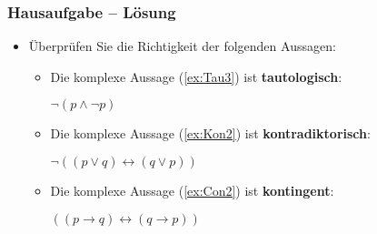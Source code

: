 
\begin{frame}
	\frametitle{Hausaufgabe -- Lösung}
	
	\begin{itemize}
		\item Überprüfen Sie die Richtigkeit der folgenden Aussagen:
		
		\vspace{1em}
		
		\begin{itemize}
			\item Die komplexe Aussage (\ref{ex:Tau3}) ist \textbf{tautologisch}:
			
			\ea\label{ex:Tau3} $\lnot (p \land \lnot p)$
			\z
			
			\item Die komplexe Aussage (\ref{ex:Kon2}) ist \textbf{kontradiktorisch}:
			
			\ea\label{ex:Kon2} $\lnot ((p \lor q) \leftrightarrow (q \lor p))$
			\z
			
			\item Die komplexe Aussage (\ref{ex:Con2}) ist \textbf{kontingent}:
			
			\ea\label{ex:Con2} $((p \rightarrow q) \leftrightarrow (q \rightarrow p))$
			\z
			
		\end{itemize}	
		
	\end{itemize}
	
\end{frame}


